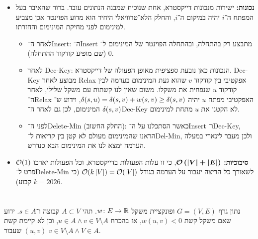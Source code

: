 \documentclass[]{../../../../tex/classes/homework}
\begin{document}
\begin{itemize}
\begin{itemize}
\begin{itemize}[*]
			\end{itemize}
			\item \textbf{נכונות: }ישירות מנכונות דייקסטרא, אחת שנוכיח שמבנה הנתונים עובד. ברור שהאיבר בעל המפתח ה־$i$ יהיה במיקום ה־$i$, והחלק הלא־טרוויאלי היחיד הוא מדוע הפוינטר אכן מצביע למינימום לפני מחיקת המינימום והחזרתו. 
			\begin{itemize}
				\item לאחר ה־Insert: ה־Insert מתבצע רק בהתחלה, ובהתחלה הפוינטר של המינימום ל־$0$ (שם מופיע קודקוד ההתחלה). 
				\item לאחר Dec-Key: הנכונות כאן נובעת ספציפית מאופן הפעולה של דייקסטרא. Dec-Key מבוצע לאחר Relax אפקטיבי בין קודקוד $v$ שהוא געת המינימום בערמה לבין קודקוד $u$ שנפחית את משקלו. משום שאין לנו קשתות עם משקל שלילי, לאחר ה־Relax האפקטיבי מפתח $u$ יהיה $\delta(s, u) = \delta(s, v) + w(s, v) \ge \delta(s, v)$, וידוע ש־$\delta(s,v)$ המינימום, לכן גם לאחר ה־Dec-Key לא הקטנו את $u$ מתחת למינימום. 
				\item לפני ה־Delete-Min (החלק החשוב): כאשר הסתכלנו על ה־Insert ו־Dec-Key,  הראנו שהמינימום מעולם לא קטן בין קריאות ל־Del-Min, ולכן מעבר לינארי במעלה הערמה ימצא לנו את המינימום הבא כנדרש. 
			\end{itemize}
			\item \textbf{סיבוכיות: }$\bm{\mathcal{O}\left ( \left \lvert V \right \rvert + \left \lvert E \right \rvert \right )}$, כי זו עלות הפעולות בדייקסטרא, וכל הפעולות יארכו $\mathcal{O}(1)$ פרט ל־Delete-Min לשאורך כל הריצה יעבור על הערמה בגודל $\mathcal{O}(k\left \lvert V \right \rvert) = \mathcal{O}(\left \lvert V \right \rvert)$ (כי $k = 2026$ קבוע). 
		\end{itemize}
	\end{itemize}
	
	\npage
	\section{}
	נתון גרף $G = (V, E)$ ופונקציית משקל $w \colon E \to \mathbb{R}$. תהי $A \subset V$ קבוצה ו־$s \in A$. ידוע שאם משקל קשת $w(u, v) < 0$, אז בהכרח $u \in A \land v \in V \setminus A$, וכן לא קיימת קשת $(u, v)$ שעבור $v \in V \setminus A \land V \in A$. 
	
\end{document}
